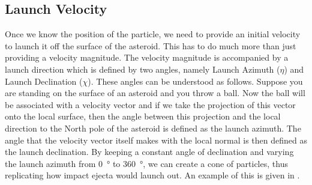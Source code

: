 \subsection{Launch Velocity}
\label{subsec:launch_velocity}
Once we know the position of the particle, we need to provide an initial velocity to launch it off the surface of the asteroid. This has to do much more than just providing a velocity magnitude. The velocity magnitude is accompanied by a launch direction which is defined by two angles, namely Launch Azimuth ($\eta$) and Launch Declination ($\chi$).
%
\newline\newline
%
These angles can be understood as follows. Suppose you are standing on the surface of an asteroid and you throw a ball. Now the ball will be associated with a velocity vector and if we take the projection of this vector onto the local surface, then the angle between this projection and the local direction to the North pole of the asteroid is defined as the launch azimuth. The angle that the velocity vector itself makes with the local normal is then defined as the launch declination. By keeping a constant angle of declination and varying the launch azimuth from \SI{0}{\degree} to \SI{360}{\degree}, we can create a cone of particles, thus replicating how impact ejecta would launch out. An example of this is given in .
